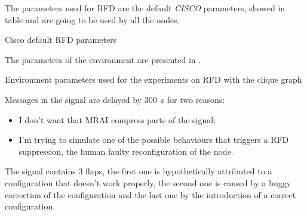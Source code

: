The parameters used for \ac{RFD} are the default \textit{CISCO} parameters,
showed in table  and are going to be used by
all the nodes.

\begin{table}[h]
	
	\caption{Cisco default \ac{RFD} parameters}
	\label{tbl:cisco_rfd}
\end{table}

The parameters of the environment are presented in .

\begin{table}[h]
	
	\caption{Environment parameters used for the experiments on \ac{RFD}
		with the clique graph}
	\label{tbl:clique_rfd_params}
\end{table}

Messages in the signal are delayed by \SI{300}{\second} for two reasons:
\begin{itemize}
    \item I don't want that \ac{MRAI} compress parts of the signal;
	\item I'm trying to simulate one of the possible behaviours that triggers a
		\ac{RFD} suppression, the human faulty reconfiguration of the node.
\end{itemize}
The signal contains \num{3} flaps, the first one is hypothetically attributed
to a configuration that doesn't work properly, the second one is caused by a
buggy correction of the configuration and the last one by the introduction of a
correct configuration.

